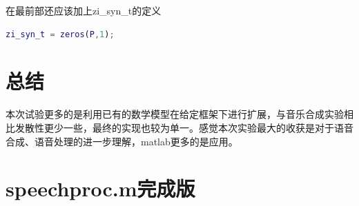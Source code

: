 \documentclass{ctexart}
\begin{document}
在最前部还应该加上zi\_syn\_t的定义
\begin{lstlisting}[language=matlab]
zi_syn_t = zeros(P,1);
\end{lstlisting}

\section{总结}
本次试验更多的是利用已有的数学模型在给定框架下进行扩展，与音乐合成实验相比发散性更少一些，最终的实现也较为单一。感觉本次实验最大的收获是对于语音合成、语音处理的进一步理解，matlab更多的是应用。

\section{speechproc.m完成版}

\end{document}
